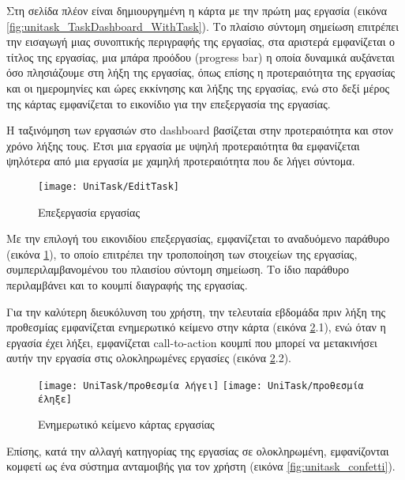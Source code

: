         Στη σελίδα πλέον είναι δημιουργημένη η κάρτα με την πρώτη μας εργασία (εικόνα \ref{fig:unitask_TaskDashboard_WithTask}). Το πλαίσιο {\Zona σύντομη σημείωση} επιτρέπει την εισαγωγή μιας συνοπτικής περιγραφής της εργασίας, στα αριστερά εμφανίζεται ο τίτλος της εργασίας, μια μπάρα προόδου (progress bar) η οποία δυναμικά αυξάνεται όσο πλησιάζουμε στη λήξη της εργασίας, όπως επίσης η προτεραιότητα της εργασίας και οι ημερομηνίες και ώρες εκκίνησης και λήξης της εργασίας, ενώ στο δεξί μέρος της κάρτας εμφανίζεται το εικονίδιο για την επεξεργασία της εργασίας.

        Η ταξινόμηση των εργασιών στο dashboard βασίζεται στην προτεραιότητα και στον χρόνο λήξης τους. Έτσι μια εργασία με υψηλή προτεραιότητα θα εμφανίζεται ψηλότερα από μια εργασία με χαμηλή προτεραιότητα που δε λήγει σύντομα.

        \begin{figure}[h!] \noindent \centering
            \texttt{[image: UniTask/EditTask]}
            \caption{\centering Επεξεργασία εργασίας}
            \label{fig:unitask_EditTask}
        \end{figure}

        Με την επιλογή του εικονιδίου επεξεργασίας, εμφανίζεται το αναδυόμενο παράθυρο (εικόνα \ref{fig:unitask_EditTask}), το οποίο επιτρέπει την τροποποίηση των στοιχείων της εργασίας, συμπεριλαμβανομένου του πλαισίου {\Zona σύντομη σημείωση}. Το ίδιο παράθυρο περιλαμβάνει και το κουμπί διαγραφής της εργασίας.

        Για την καλύτερη διευκόλυνση του χρήστη, την τελευταία εβδομάδα πριν λήξη της προθεσμίας εμφανίζεται ενημερωτικό κείμενο στην κάρτα (εικόνα \ref{fig:unitask_cardInfo}.1), ενώ όταν η εργασία έχει λήξει, εμφανίζεται call-to-action κουμπί που μπορεί να μετακινήσει αυτήν την εργασία στις ολοκληρωμένες εργασίες (εικόνα \ref{fig:unitask_cardInfo}.2).

        \begin{figure}[h!] \noindent \centering
            \texttt{[image: UniTask/προθεσμία λήγει]}
            \texttt{[image: UniTask/προθεσμία έληξε]}
            \caption{\centering Ενημερωτικό κείμενο κάρτας εργασίας}
            \label{fig:unitask_cardInfo}
        \end{figure}

        Επίσης, κατά την αλλαγή κατηγορίας της εργασίας σε ολοκληρωμένη, εμφανίζονται κομφετί ως ένα σύστημα ανταμοιβής για τον χρήστη (εικόνα \ref{fig:unitask_confetti}).

